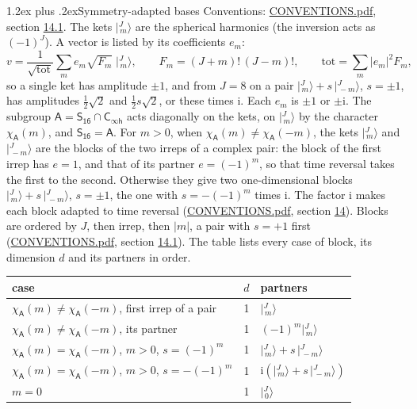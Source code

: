 \documentclass[10pt,a4paper]{article}
\makeatletter
\renewcommand\section{\@startsection{section}{1}{\z@}{-3ex plus -1ex minus -.2ex}%
  {1.2ex plus .2ex}{\normalfont\large\sffamily\bfseries\color{parttitle}}}
\numberwithin{equation}{section}
\newcommand{\grp}[1]{\mathsf{#1}}
\newcommand{\iunit}{\mathrm{i}}
\newcommand{\chiA}{\chi_{\grp{A}}}
\newcommand{\jm}[2]{\bigl\lvert{}^{#1}_{\,#2}\bigr\rangle}
\makeatother
\begin{document}
\section{Symmetry-adapted bases}\label{s:bases}
Conventions: \href{../../CONVENTIONS.pdf}{CONVENTIONS.pdf}, section \href{../../CONVENTIONS.pdf\#conv.14.1}{14.1}.
\leavevmode\label{n:index.m}\label{n:vector.ket}The kets $\jm{J}{m}$ are the spherical harmonics (the inversion acts as $(-1)^J$). \label{n:index.ketcoefficient}\label{n:vector.basis.symmetry}\label{n:index.ketweight}\label{n:index.total}A vector is listed by its coefficients $e_m$:
\begin{equation}\label{e:ket}v = \frac{1}{\sqrt{\mathrm{tot}}}\sum_m e_m\sqrt{F_m}\;\jm{J}{m},\qquad F_m = (J+m)!\,(J-m)!,\qquad \mathrm{tot} = \sum_m |e_m|^2F_m,\end{equation}
\leavevmode\label{n:index.pair.sign}so a single ket has amplitude $\pm1$, and from $J = 8$ on a pair $\jm{J}{m} + s\,\jm{J}{-m}$, $s = \pm1$, has amplitudes $\tfrac{1}{2}\sqrt{2}$ and $\tfrac{1}{2}s\sqrt{2}$, or these times $\iunit$. Each $e_m$ is $\pm1$ or $\pm\iunit$.
\leavevmode\label{n:group.A}\label{n:function.character.abelian}The subgroup $\grp{A} = \grp{S_{16}}\cap\grp{C_{\infty h}}$ acts diagonally on the kets, on $\jm{J}{m}$ by the character $\chiA(m)$, and $\grp{S_{16}} = \grp{A}$. For $m > 0$, when $\chiA(m) \ne \chiA(-m)$, the kets $\jm{J}{m}$ and $\jm{J}{-m}$ are the blocks of the two irreps of a complex pair: the block of the first irrep has $e = 1$, and that of its partner $e = (-1)^m$, so that time reversal takes the first to the second. Otherwise they give two one-dimensional blocks $\jm{J}{m} + s\,\jm{J}{-m}$, $s = \pm1$, the one with $s = -(-1)^m$ times $\iunit$. The factor $\iunit$ makes each block adapted to time reversal (\href{../../CONVENTIONS.pdf}{CONVENTIONS.pdf}, section \href{../../CONVENTIONS.pdf\#conv.14}{14}). Blocks are ordered by $J$, then irrep, then $|m|$, a pair with $s = +1$ first (\href{../../CONVENTIONS.pdf}{CONVENTIONS.pdf}, section \href{../../CONVENTIONS.pdf\#conv.14.1}{14.1}).
\leavevmode\label{n:head.case}\label{n:head.partners}The table lists every case of block, its dimension $d$ and its partners in order.
\begin{center}\begin{tabular}{@{}lrl@{}}\toprule
case & $d$ & partners\\\midrule
$\chiA(m) \ne \chiA(-m)$, first irrep of a pair & 1 & $\jm{J}{m}$\\
$\chiA(m) \ne \chiA(-m)$, its partner & 1 & $(-1)^m\jm{J}{m}$\\
$\chiA(m) = \chiA(-m)$, $m > 0$, $s = (-1)^m$ & 1 & $\jm{J}{m} + s\,\jm{J}{-m}$\\
$\chiA(m) = \chiA(-m)$, $m > 0$, $s = -(-1)^m$ & 1 & $\iunit(\jm{J}{m} + s\,\jm{J}{-m})$\\
$m = 0$ & 1 & $\jm{J}{0}$\\
\bottomrule\end{tabular}\end{center}
\end{document}
